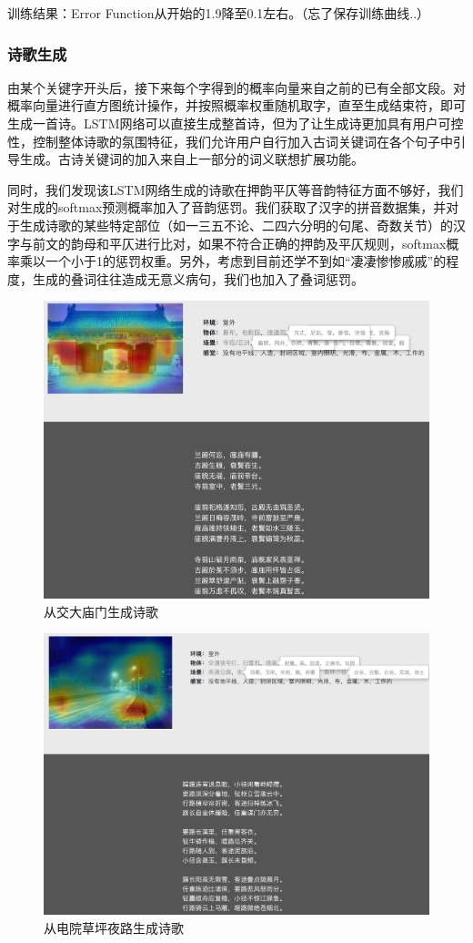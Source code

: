\documentclass[a4paper, 10pt]{article}
\begin{document}
训练结果：Error Function从开始的1.9降至0.1左右。（忘了保存训练曲线..）

\subsubsection*{诗歌生成}
由某个关键字开头后，接下来每个字得到的概率向量来自之前的已有全部文段。对概率向量进行直方图统计操作，并按照概率权重随机取字，直至生成结束符，即可生成一首诗。LSTM网络可以直接生成整首诗，但为了让生成诗更加具有用户可控性，控制整体诗歌的氛围特征，我们允许用户自行加入古词关键词在各个句子中引导生成。古诗关键词的加入来自上一部分的词义联想扩展功能。

同时，我们发现该LSTM网络生成的诗歌在押韵平仄等音韵特征方面不够好，我们对生成的softmax预测概率加入了音韵惩罚。我们获取了汉字的拼音数据集，并对于生成诗歌的某些特定部位（如一三五不论、二四六分明的句尾、奇数关节）的汉字与前文的韵母和平仄进行比对，如果不符合正确的押韵及平仄规则，softmax概率乘以一个小于1的惩罚权重。另外，考虑到目前还学不到如“凄凄惨惨戚戚”的程度，生成的叠词往往造成无意义病句，我们也加入了叠词惩罚。

\begin{figure}[H]
\centering
\includegraphics[width=0.9\linewidth]{imgs/6.png}
\caption{从交大庙门生成诗歌}
\end{figure}
\begin{figure}[H]
\centering
\includegraphics[width=0.9\linewidth]{imgs/7.png}
\caption{从电院草坪夜路生成诗歌}
\end{figure}
\end{document}
